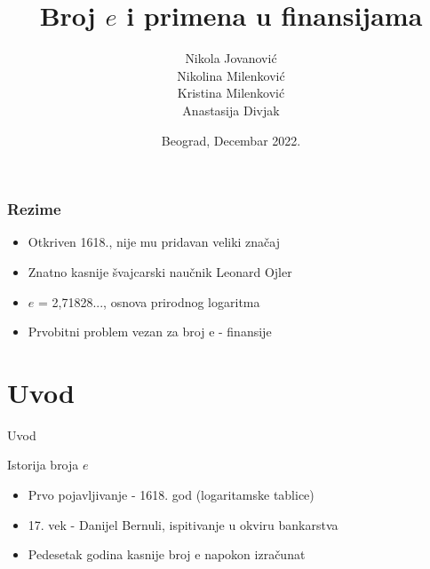 \documentclass[xcolor=dvipsnames]{beamer}
\title{Broj $e$ i primena u finansijama}
\author[Jovanović, Milenković, Milenković, Divjak]{Nikola Jovanović \\ Nikolina Milenković \\  Kristina Milenković \\ Anastasija Divjak}
\institute{Univerzitet u Beogradu, Matematički fakultet}
\date{Beograd, Decembar 2022.}
\begin{document}
\begin{frame}
  \titlepage
\end{frame}

\begin{frame}
\frametitle{Rezime}
\begin{itemize}
 \item Otkriven 1618., nije mu pridavan veliki značaj
 \item Znatno kasnije švajcarski naučnik Leonard Ojler
 \item $e$ = 2,71828..., osnova prirodnog logaritma
 \item Prvobitni problem vezan za broj e - finansije
\end{itemize}
\end{frame}

\section{Uvod}
\begin{frame}{Uvod}
\begin{block}{Istorija broja $e$}
    \begin{itemize}
        \item Prvo pojavljivanje - 1618. god (logaritamske tablice)
        \item 17. vek - Danijel Bernuli, ispitivanje u okviru bankarstva
        \item Pedesetak godina kasnije broj e napokon izračunat
    \end{itemize}
\end{block}
\end{frame}
\end{document}
